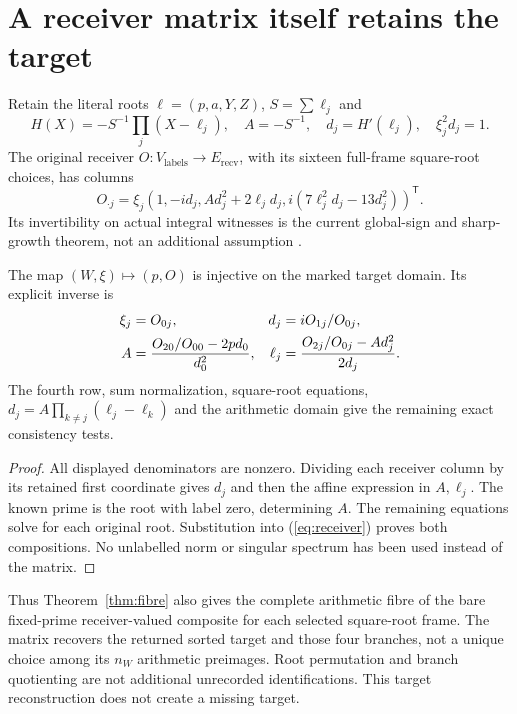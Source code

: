 

\section{A receiver matrix itself retains the target}
Retain the literal roots $\ell=(p,a,Y,Z)$, $S=\sum\ell_j$ and
\[
 H(X)=-S^{-1}\prod_j(X-\ell_j),\quad A=-S^{-1},\quad
 d_j=H'(\ell_j),\quad \xi_j^2d_j=1.
\]
The original receiver
$O:V_{\mathrm{labels}}\longrightarrow E_{\mathrm{recv}}$, with its sixteen
full-frame square-root choices, has
columns
\begin{equation}\label{eq:receiver}
 O_{\cdot j}=\xi_j(1,-id_j,Ad_j^2+2\ell_jd_j,
                  i(7\ell_j^2d_j-13d_j^2))^{\mathsf T}.
\end{equation}
Its invertibility on actual integral witnesses is the current global-sign
and sharp-growth theorem, not an additional assumption \citep{Sharp}.

\begin{proposition}\label{prop:target}
The map $(W,\xi)\mapsto(p,O)$ is injective on the marked target domain.
Its explicit inverse is
\begin{align}
 \xi_j&=O_{0j},& d_j&=iO_{1j}/O_{0j},\label{eq:matrixreturn}\\
 A&=\frac{O_{20}/O_{00}-2pd_0}{d_0^2},&
 \ell_j&=\frac{O_{2j}/O_{0j}-Ad_j^2}{2d_j}.\notag
\end{align}
 The fourth row, sum normalization, square-root equations,
 $d_j=A\prod_{k\ne j}(\ell_j-\ell_k)$ and the arithmetic domain give the
 remaining exact consistency tests.
\end{proposition}
\begin{proof}
All displayed denominators are nonzero. Dividing each receiver column by
its retained first coordinate gives $d_j$ and then the affine expression in
$A,\ell_j$. The known prime is the root with label zero, determining $A$.
The remaining equations solve for each original root. Substitution into
(\ref{eq:receiver}) proves both compositions. No unlabelled norm or singular
spectrum has been used instead of the matrix.
\end{proof}
Thus Theorem~\ref{thm:fibre} also gives the complete arithmetic fibre of the
bare fixed-prime receiver-valued composite for each selected square-root frame.
The matrix recovers the returned sorted target and those four branches, not a
unique choice among its $n_W$ arithmetic preimages. Root permutation and branch
quotienting are not additional unrecorded identifications. This target
reconstruction does not create a missing target.

